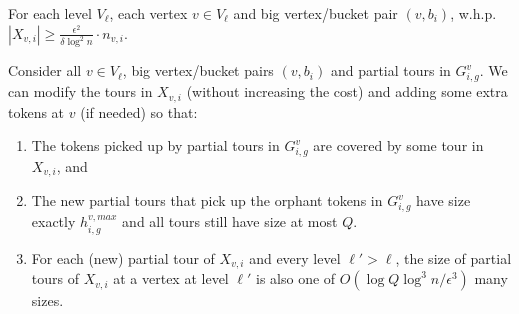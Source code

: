 \documentclass[twoside,leqno]{article}
\newcommand{\calT}{{\cal T}}
\newcommand{\eps}{\epsilon}
\begin{document}
\vspace{-1.5mm}
\begin{lemma}\label{lem:extra}
For each level $V_\ell$, each vertex $v\in V_\ell$ and big vertex/bucket pair $(v,b_i)$,
w.h.p. $|X_{v,i}|\geq \frac{\eps^2}{\delta\log^2 n}\cdot n_{v,i}$.
\vspace{-3.5mm}
\end{lemma}
\begin{lemma}\label{lem:extra2}
Consider all $v\in V_\ell$, big vertex/bucket pairs $(v,b_i)$ and partial tours in $G^v_{i,g}$.
We can modify the tours in $X_{v,i}$ (without increasing the cost) and adding some extra tokens at $v$ (if needed) so that:
\begin{enumerate}
\item The tokens picked up by partial tours in $G^v_{i,g}$ are covered by some tour in $X_{v,i}$, and
\vspace{-1mm}
\item The new partial tours that pick up the orphant tokens in $G^v_{i,g}$
have size exactly $h^{v,max}_{i,g}$ and all tours still have size at most $Q$.
\item For each (new) partial tour of $X_{v,i}$ and every level $\ell'>\ell$, the size of partial tours of $X_{v,i}$ at a
vertex at level $\ell'$ is also one of $O(\log Q\log^3 n/\eps^3)$ many sizes.
\end{enumerate}
\end{lemma}
\end{document}

